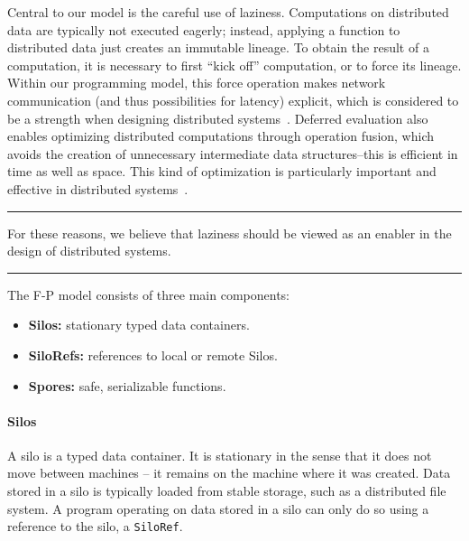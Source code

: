 \documentclass[preprint]{sigplanconf}
\theoremstyle{definition}
\theoremstyle{definition}
\begin{document}
Central to our model is the careful use of laziness. Computations on
distributed data are typically not executed eagerly; instead, applying a
function to distributed data just creates an immutable lineage. To obtain the
result of a computation, it is necessary to first ``kick off'' computation, or
to force its lineage. Within our programming model, this force
operation
makes network communication (and thus
possibilities for latency) explicit, which is considered to be a strength when
designing distributed systems~\cite{ANoteDistComp}. Deferred evaluation also
enables optimizing distributed computations through operation fusion, which
avoids the creation of unnecessary intermediate data structures--this is
efficient in time as well as space. This kind of optimization is particularly
important and effective in distributed systems~\cite{FlumeJava}.

\vspace{-3mm}
\begin{center}\noindent\rule{8cm}{0.4pt}\end{center}
\begin{displayquote}
For these reasons, we believe that laziness should be viewed as an enabler in
the design of distributed systems.
\end{displayquote}
\vspace{-4mm}
\begin{center}\noindent\rule{8cm}{0.4pt}\end{center}
\vspace{1mm}

\noindent The F-P model consists of three main components:
\begin{itemize}[noitemsep]
  \item {\bf Silos:} stationary typed data containers.
  \item {\bf SiloRefs:} references to local or remote Silos.
  \item {\bf Spores:} safe, serializable functions.
\end{itemize}
\vspace{1mm}

\paragraph{Silos}
A silo is a typed data container. It is stationary in the sense that it does
not move between machines -- it remains on the machine where it was created.
Data stored in a silo is typically loaded from stable storage, such as a
distributed file system. A program operating on data stored in a silo can only
do so using a reference to the silo, a \verb|SiloRef|.
\end{document}
